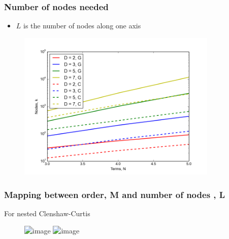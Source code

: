 \documentclass{beamer}
\begin{document}
 
 \begin{frame}
  \frametitle{Number of nodes needed}
  \begin{itemize}
   \item $L$ is the number of nodes along one axis
  \end{itemize}

 \begin{figure}
  \includegraphics[width=0.85\textwidth]{dimensionality_nodes_sparse.png}
 \end{figure}
 \end{frame}

  
  \begin{frame}
   \frametitle{Mapping between order, M and number of nodes , L}
   For nested Clenshaw-Curtis
   \begin{figure}
    \includegraphics<1>[width=0.85\textwidth]{LvsM1.png}
    \includegraphics<2>[width=0.85\textwidth]{LvsM.png}
   \end{figure}

   

  \end{frame}

  
  
\end{document}
